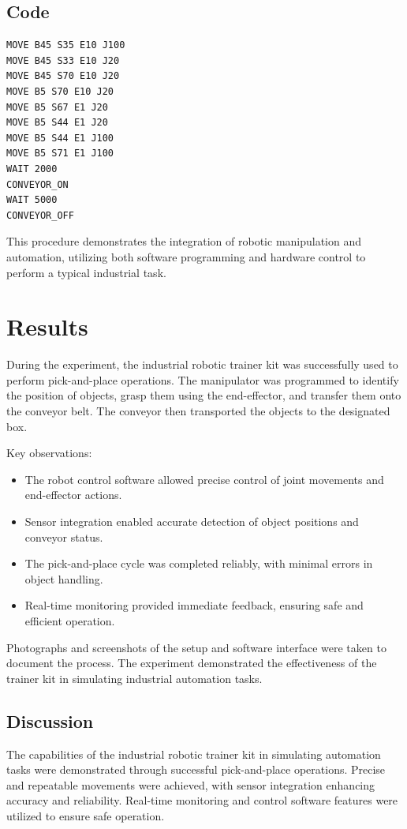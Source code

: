 \documentclass[12pt]{article}
\begin{document}
\subsection*{Code}
\begin{verbatim}
MOVE B45 S35 E10 J100 
MOVE B45 S33 E10 J20 
MOVE B45 S70 E10 J20 
MOVE B5 S70 E10 J20 
MOVE B5 S67 E1 J20 
MOVE B5 S44 E1 J20 
MOVE B5 S44 E1 J100 
MOVE B5 S71 E1 J100 
WAIT 2000 
CONVEYOR_ON 
WAIT 5000 
CONVEYOR_OFF
\end{verbatim}

This procedure demonstrates the integration of robotic manipulation and automation, utilizing both software programming and hardware control to perform a typical industrial task.

\section*{Results}
During the experiment, the industrial robotic trainer kit was successfully used to perform pick-and-place operations. The manipulator was programmed to identify the position of objects, grasp them using the end-effector, and transfer them onto the conveyor belt. The conveyor then transported the objects to the designated box.

Key observations:
\begin{itemize}
    \item The robot control software allowed precise control of joint movements and end-effector actions.
    \item Sensor integration enabled accurate detection of object positions and conveyor status.
    \item The pick-and-place cycle was completed reliably, with minimal errors in object handling.
    \item Real-time monitoring provided immediate feedback, ensuring safe and efficient operation.
\end{itemize}

Photographs and screenshots of the setup and software interface were taken to document the process. The experiment demonstrated the effectiveness of the trainer kit in simulating industrial automation tasks.

\subsection*{Discussion}
The capabilities of the industrial robotic trainer kit in simulating automation tasks were demonstrated through successful pick-and-place operations. Precise and repeatable movements were achieved, with sensor integration enhancing accuracy and reliability. Real-time monitoring and control software features were utilized to ensure safe operation.
\end{document}
